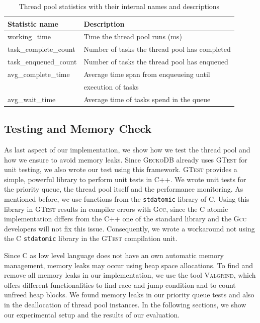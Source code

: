\documentclass[conference]{IEEEtran}
\begin{document}
\begin{table}[htbp]
	\caption{Thread pool statistics with their internal names and descriptions}
	\begin{center}
		\begin{tabular}{ l l }
			\hline
			\textbf{Statistic name}&\textbf{Description}\\
			\hline
			working\_time & Time the thread pool runs (ms) \\
			task\_complete\_count & Number of tasks the thread pool has completed\\
			task\_enqueued\_count & Number of tasks the thread pool has enqueued \\
			avg\_complete\_time & Average time span from enqueueing until \\
			& execution of tasks \\
			avg\_wait\_time & Average time of tasks spend in the queue \\
			\hline
		\end{tabular}
		\label{tab4}
	\end{center}
\end{table}

\subsection{Testing and Memory Check}
As last aspect of our implementation, we show how we test the thread pool and how we ensure to avoid memory leaks. Since \textsc{GeckoDB} already uses \textsc{GTest} \cite{sen2010quick} for unit testing, we also wrote our test using this framework. \textsc{GTest} provides a simple, powerful library to perform unit tests in \textsc{C++}. We wrote unit tests for the priority queue, the thread pool itself and the performance monitoring. As mentioned before, we use functions from the \texttt{stdatomic} library of C. Using this library in \textsc{GTest} results in compiler errors with \textsc{Gcc}, since the C atomic implementation differs from the \textsc{C++} one of the standard library and the \textsc{Gcc} developers will not fix this issue. Consequently, we wrote a workaround not using the C \texttt{stdatomic} library in the \textsc{GTest} compilation unit.

Since C as low level language does not have an own automatic memory management, memory leaks may occur using heap space allocations. To find and remove all memory leaks in our implementation, we use the tool \textsc{Valgrind}, which offers different functionalities to find race and jump condition and to count unfreed heap blocks. We found memory leaks in our priority queue tests and also in the deallocation of thread pool instances. In the following sections, we show our experimental setup and the results of our evaluation.
\end{document}
